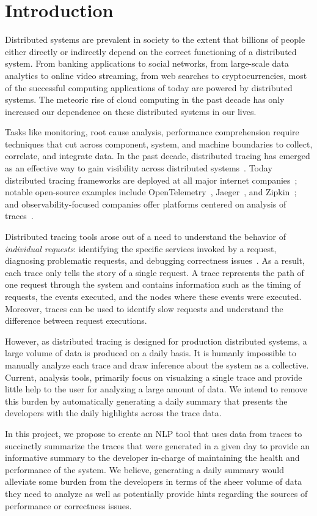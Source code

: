 \section{Introduction}

Distributed systems are prevalent in society to the extent that billions of people either directly or 
indirectly depend on the correct functioning of a distributed system. From banking applications to social
networks, from large-scale data analytics to online video streaming, from web searches to cryptocurrencies,
most of the successful computing applications of today are powered by distributed systems.
The meteoric rise of cloud computing in the past decade has only increased our dependence on these
distributed systems in our lives.

Tasks like monitoring, root cause analysis, performance comprehension require techniques that cut across component,
system, and machine boundaries to collect, correlate, and integrate data. In the past decade, distributed tracing has emerged as an effective way to gain visibility across distributed systems~\cite{mace2015pivot,mace2018universal,fonseca2007xtrace}.  
Today distributed tracing frameworks are deployed at all major internet companies~\cite{kaldor2017canopy,sigelman2010dapper,netflixtracing}; 
notable open-source examples include OpenTelemetry~\cite{opentelemetry}, Jaeger~\cite{jaeger}, and Zipkin~\cite{zipkin}; and 
observability-focused companies offer platforms centered on analysis of traces~\cite{lightstep}.

Distributed tracing tools arose out of a need to understand the behavior of \emph{individual requests}: identifying the specific services 
invoked by a request, diagnosing problematic requests, and debugging correctness issues~\cite{fonseca2007xtrace,sigelman2010dapper,macewe}.
As a result, each trace only tells the story of a single request.
A trace represents the path of one request through the system and contains information such as the timing of requests, 
the events executed, and the nodes where these events were executed. Moreover, traces can be used
to identify slow requests and understand the difference between request executions. 

However, as distributed tracing is designed for production distributed systems, a large volume of data
is produced on a daily basis. It is humanly impossible to manually analyze each trace and draw inference
about the system as a collective. Current, analysis tools, primarily focus on visualzing a single trace
and provide little help to the user for analyzing a large amount of data. We intend to remove this burden
by automatically generating a daily summary that presents the developers with the daily highlights
across the trace data.

In this project, we propose to create an NLP tool that uses data from traces to succinctly summarize
the traces that were generated in a given day to provide an informative summary to the developer
in-charge of maintaining the health and performance of the system. We believe, generating a daily summary
would alleviate some burden from the developers in terms of the sheer volume of data they need to analyze
as well as potentially provide hints regarding the sources of performance or correctness issues.